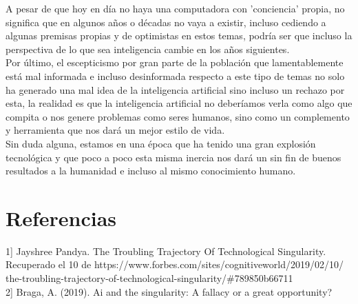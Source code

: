 \documentclass[11pt]{article}
\begin{document}
A pesar de que hoy en día no haya una computadora con 'conciencia' propia, no significa que en algunos años o décadas no vaya a existir, incluso cediendo a algunas premisas propias y de optimistas en estos temas, podría ser que incluso la perspectiva de lo que sea inteligencia cambie en los años siguientes.\\

Por  último, el escepticismo por gran parte de la población que lamentablemente está mal informada e incluso desinformada respecto a este tipo de temas no solo ha generado una mal idea de la inteligencia artificial sino incluso un rechazo por esta, la realidad es que la inteligencia artificial no deberíamos verla como algo que compita o nos genere problemas como seres humanos, sino como un complemento y herramienta que nos dará un mejor estilo de vida. \\

Sin duda alguna, estamos en una época que ha tenido una gran explosión tecnológica y que poco a poco esta misma inercia nos dará un sin fin de buenos resultados a la humanidad e incluso al mismo conocimiento humano.



\section{Referencias}

1] Jayshree Pandya. The Troubling Trajectory Of Technological Singularity. Recuperado el 10 de  https://www.forbes.com/sites/cognitiveworld/2019/02/10/\\the-troubling-trajectory-of-technological-singularity/\#789850b66711\\

2] Braga, A. (2019). Ai and the singularity: A fallacy or a great opportunity?
\end{document}
